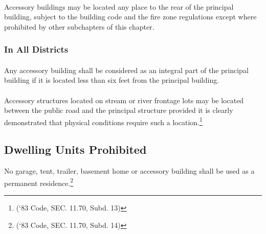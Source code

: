 \paragraph{}
Accessory buildings may be located any place to the rear of the principal building, subject to the building code and the fire zone regulations except where prohibited by other subchapters of this chapter.
\subsubsection{In All Districts}
\paragraph{}
Any accessory building shall be considered as an integral part of the principal building if it is located less than six feet from the principal building.
\paragraph{}
Accessory structures located on stream or river frontage lots may be located between the public road and the principal structure provided it is clearly demonstrated that physical conditions require such a location.\footnote{(‘83 Code, SEC. 11.70, Subd. 13)}
\subsection{Dwelling Units Prohibited}
No garage, tent, trailer, basement home or accessory building shall be used as a permanent residence.\footnote{(‘83 Code, SEC. 11.70, Subd. 14)}
